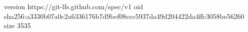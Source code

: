 version https://git-lfs.github.com/spec/v1
oid sha256:a3330b07a0c2a6336176b7d9bef08ccc5937da49d204422da4ffc3058be56260
size 3535
